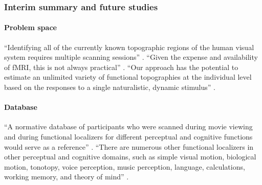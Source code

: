 \subsubsection{Interim summary and future studies}






\paragraph{Problem space}

%
``Identifying all of the currently known topographic regions of the human visual
system requires multiple scanning sessions'' \citep{wang2015probabilistic}.
%
``Given the expense and availability of fMRI, this is not always practical''
\citep{wang2015probabilistic}.
%
``Our approach has the potential to estimate an unlimited variety of functional
topographies at the individual level based on the responses to a single
naturalistic, dynamic stimulus'' \citep{jiahui2020predicting}.


\paragraph{Database}

%
``A normative database of participants who were scanned during movie viewing and
during functional localizers for different perceptual and cognitive functions
would serve as a reference'' \citep{jiahui2020predicting}.
%
``There are numerous other functional localizers in other perceptual and
cognitive domains, such as simple visual motion, biological motion, tonotopy,
voice perception, music perception, language, calculations, working memory, and
theory of mind'' \citep{jiahui2020predicting}.

